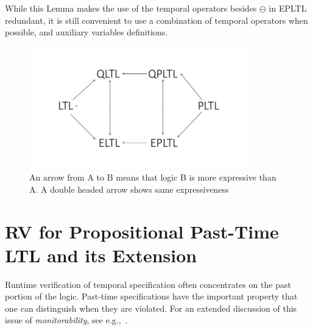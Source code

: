 While this Lemma makes the use of the temporal operators
besides $\ominus$ in EPLTL redundant, it is still
convenient to use a combination of
temporal operators when possible, and
auxiliary variables definitions.
\fi








\begin{figure}
\begin{center}
\includegraphics[width=3.7in]{PROP.jpg}
\caption{\label{prop} An arrow from A to B means that logic  B is more expressive than A. A double headed arrow shows same expressiveness}
\end{center}
\end{figure}




\section{RV for Propositional Past-Time LTL and its Extension}
\label{LTLruntime}

Runtime verification of temporal specification often
concentrates on the past portion of the logic.  Past-time  specifications have the important property that one can distinguish when they are violated. For an extended discussion of this issue of {\em monitorability}, see e.g.,~\cite{Ugly,FFM}.

